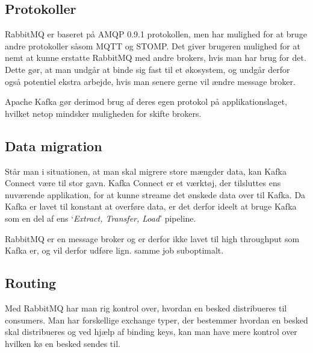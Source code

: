 \documentclass[
]{article}
\begin{document}
\hypertarget{section}{%
\subsection{}\label{section}}

\hypertarget{protokoller}{%
\subsection{Protokoller}\label{protokoller}}

RabbitMQ er baseret på AMQP 0.9.1 protokollen, men har mulighed for at
bruge andre protokoller såsom MQTT og STOMP.\cite{rabbit-protocols} Det giver brugeren mulighed for at nemt at kunne erstatte RabbitMQ med andre brokers, hvis man har
brug for det. Dette gør, at man undgår at binde sig fast til et
økosystem, og undgår derfor også potentiel ekstra arbejde, hvis man
senere gerne vil ændre message broker.

Apache Kafka gør derimod brug af deres egen protokol på
applikationslaget, hvilket
netop mindsker muligheden for skifte brokers.\cite{kafka-protocol}

\hypertarget{data-migration}{%
\subsection{Data migration}\label{data-migration}}

Står man i situationen, at man skal migrere store mængder data, kan
Kafka Connect være til stor gavn. Kafka Connect er et værktøj, der
tilsluttes ens nuværende applikation, for at kunne streame det ønskede
data over til Kafka. Da Kafka er lavet til konstant at overføre data, er
det derfor ideelt at bruge Kafka som en del af ens `\emph{Extract,
Transfer, Load}' pipeline.\cite{kafka-connect}


RabbitMQ er en message broker og er derfor ikke lavet til high
throughput som Kafka er, og vil derfor udføre lign. samme job
suboptimalt.\cite{kafka-rabbit-comparison}

\hypertarget{routing}{%
\subsection{Routing}\label{routing}}

Med RabbitMQ har man rig kontrol over, hvordan en besked distribueres
til consumers. Man har forskellige exchange typer\cite{rabbit-exchange-types},
der bestemmer hvordan en besked skal distribueres og ved hjælp af
binding keys, kan man have mere kontrol over hvilken kø en besked sendes
til.\cite{rabbit-routing}
\end{document}
